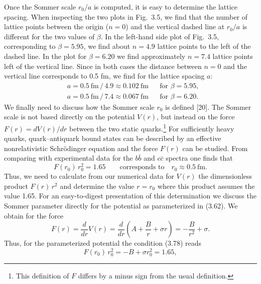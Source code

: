 Once the Sommer scale $r_0/a$ is computed, it is easy to determine the lattice
spacing. When inspecting the two plots in Fig.~3.5, we find that the number of
lattice points between the origin ($n = 0$) and the vertical dashed line at
$r_0/a$ is different for the two values of $\beta$. In the left-hand side plot
of Fig.~3.5, corresponding to $\beta = 5.95$, we find about $n = 4.9$ lattice
points to the left of the dashed line. In the plot for $\beta = 6.20$ we find
approximately $n = 7.4$ lattice points left of the vertical line. Since in both
cases the distance between $n = 0$ and the vertical line corresponds to 0.5 fm,
we find for the lattice spacing $a$:
\begin{equation}
\begin{aligned}
  &a = 0.5\ \mathrm{fm}\,/\,4.9 \approx 0.102\ \mathrm{fm}
    && \text{for }\beta = 5.95 ,\\
  &a = 0.5\ \mathrm{fm}\,/\,7.4 \approx 0.067\ \mathrm{fm}
    && \text{for }\beta = 6.20 .
\end{aligned}
\end{equation}
We finally need to discuss how the Sommer scale $r_0$ is defined [20]. The
Sommer scale is not based directly on the potential $V(r)$, but instead on the
force $F(r) = dV(r)/dr$ between the two static quarks.\footnote{This definition
of $F$ differs by a minus sign from the usual definition.} For sufficiently
heavy quarks, quark--antiquark bound states can be described by an effective
nonrelativistic Schr\"odinger equation and the force $F(r)$ can be studied.
From comparing with experimental data for the $b\bar b$ and $c\bar c$ spectra
one finds that
\begin{equation}
  F(r_0)\,r_0^2 = 1.65 \qquad \text{corresponds to} \quad r_0 \approx 0.5\ \mathrm{fm} .
\end{equation}
Thus, we need to calculate from our numerical data for $V(r)$ the dimensionless
product $F(r)\,r^2$ and determine the value $r = r_0$ where this product
assumes the value 1.65. For an easy-to-digest presentation of this
determination we discuss the Sommer parameter directly for the potential as
parameterized in (3.62). We obtain for the force
\begin{equation}
  F(r) = \frac{d}{dr}V(r)
  = \frac{d}{dr}\left(A + \frac{B}{r} + \sigma r\right)
  = -\frac{B}{r^2} + \sigma .
\end{equation}
Thus, for the parameterized potential the condition (3.78) reads
\begin{equation}
  F(r_0)\,r_0^2 = -B + \sigma r_0^2 = 1.65 ,
\end{equation}
